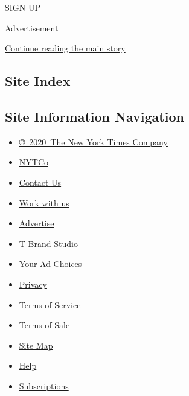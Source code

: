 \href{/newsletters/signup/TZ}{SIGN UP}

Advertisement

\protect\hyperlink{after-mktg}{Continue reading the main story}

\hypertarget{site-index}{%
\subsection{Site Index}\label{site-index}}

\hypertarget{site-information-navigation}{%
\subsection{Site Information
Navigation}\label{site-information-navigation}}

\begin{itemize}
\tightlist
\item
  \href{https://help.nytimes.com/hc/en-us/articles/115014792127-Copyright-notice}{©~2020~The
  New York Times Company}
\end{itemize}

\begin{itemize}
\tightlist
\item
  \href{https://www.nytco.com/}{NYTCo}
\item
  \href{https://help.nytimes.com/hc/en-us/articles/115015385887-Contact-Us}{Contact
  Us}
\item
  \href{https://www.nytco.com/careers/}{Work with us}
\item
  \href{https://nytmediakit.com/}{Advertise}
\item
  \href{http://www.tbrandstudio.com/}{T Brand Studio}
\item
  \href{https://www.nytimes.com/privacy/cookie-policy\#how-do-i-manage-trackers}{Your
  Ad Choices}
\item
  \href{https://www.nytimes.com/privacy}{Privacy}
\item
  \href{https://help.nytimes.com/hc/en-us/articles/115014893428-Terms-of-service}{Terms
  of Service}
\item
  \href{https://help.nytimes.com/hc/en-us/articles/115014893968-Terms-of-sale}{Terms
  of Sale}
\item
  \href{https://spiderbites.nytimes.com}{Site Map}
\item
  \href{https://help.nytimes.com/hc/en-us}{Help}
\item
  \href{https://www.nytimes.com/subscription?campaignId=37WXW}{Subscriptions}
\end{itemize}
